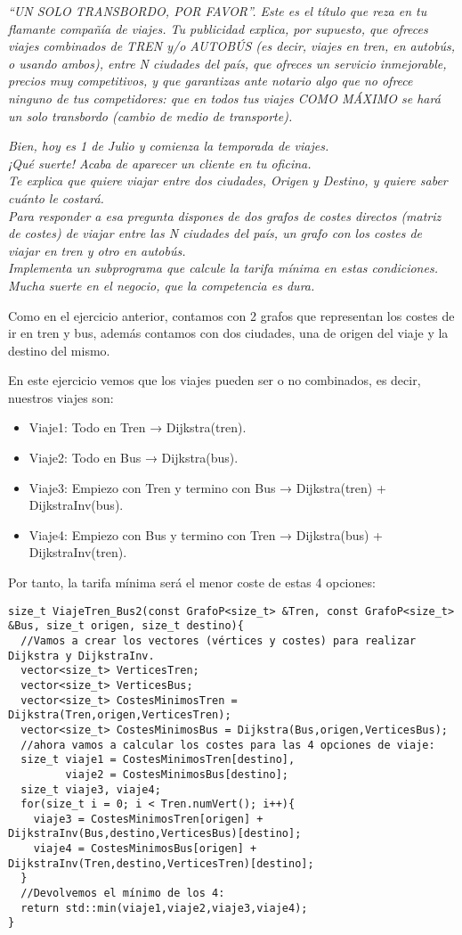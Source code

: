 \textbf{\large{}}\textit{ “UN SOLO TRANSBORDO, POR FAVOR”. Este es el título que reza en tu flamante compañía de viajes. Tu publicidad explica, por supuesto, que ofreces viajes combinados de TREN y/o AUTOBÚS (es decir, viajes en tren, en autobús, o usando ambos), entre N ciudades del país, que ofreces un servicio inmejorable, precios muy competitivos, y que garantizas ante notario algo que no ofrece ninguno de tus competidores: que en todos tus viajes COMO MÁXIMO se hará un solo transbordo (cambio de medio de transporte).}

\textit{Bien, hoy es 1 de Julio y comienza la temporada de viajes.\\
¡Qué suerte! Acaba de aparecer un cliente en tu oficina.\\ Te explica que quiere viajar entre dos ciudades, Origen y Destino, y quiere saber cuánto le costará.\\
Para responder a esa pregunta dispones de dos grafos de costes directos (matriz de costes) de viajar entre las N ciudades del país, un grafo con los costes de viajar en tren y otro en autobús.\\
Implementa un subprograma que calcule la tarifa mínima en estas condiciones. Mucha suerte en el negocio, que la competencia es dura.}

Como en el ejercicio anterior, contamos con 2 grafos que representan los costes de ir en tren y bus, además contamos con dos ciudades, una de origen del viaje y la destino del mismo.

En este ejercicio vemos que los viajes pueden ser o no combinados, es decir, nuestros viajes son:
\begin{itemize}
  \item Viaje1: Todo en Tren → Dijkstra(tren).
  \item Viaje2: Todo en Bus  → Dijkstra(bus).
  \item Viaje3: Empiezo con Tren y termino con Bus  → Dijkstra(tren) + DijkstraInv(bus).
  \item Viaje4: Empiezo con Bus y termino con Tren  → Dijkstra(bus) + DijkstraInv(tren).
\end{itemize}

Por tanto, la tarifa mínima será el menor coste de estas 4 opciones:
\begin{verbatim}
size_t ViajeTren_Bus2(const GrafoP<size_t> &Tren, const GrafoP<size_t> &Bus, size_t origen, size_t destino){
  //Vamos a crear los vectores (vértices y costes) para realizar Dijkstra y DijkstraInv.
  vector<size_t> VerticesTren;
  vector<size_t> VerticesBus;
  vector<size_t> CostesMinimosTren = Dijkstra(Tren,origen,VerticesTren);
  vector<size_t> CostesMinimosBus = Dijkstra(Bus,origen,VerticesBus);
  //ahora vamos a calcular los costes para las 4 opciones de viaje:
  size_t viaje1 = CostesMinimosTren[destino],
         viaje2 = CostesMinimosBus[destino];
  size_t viaje3, viaje4;
  for(size_t i = 0; i < Tren.numVert(); i++){
    viaje3 = CostesMinimosTren[origen] + DijkstraInv(Bus,destino,VerticesBus)[destino];
    viaje4 = CostesMinimosBus[origen] + DijkstraInv(Tren,destino,VerticesTren)[destino];
  }
  //Devolvemos el mínimo de los 4:
  return std::min(viaje1,viaje2,viaje3,viaje4);
}
\end{verbatim}

